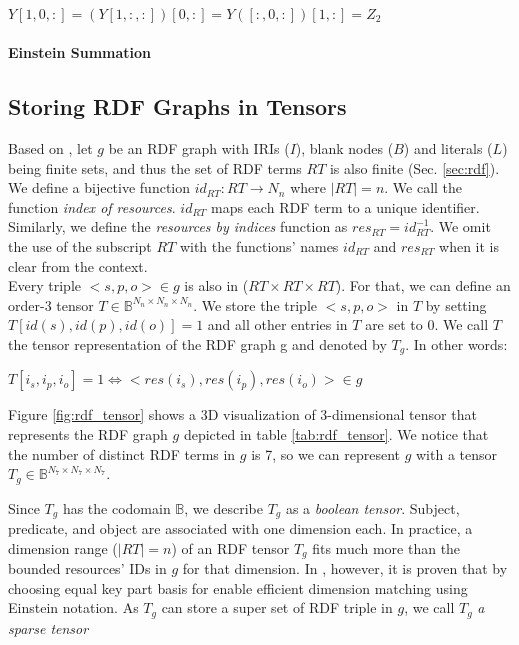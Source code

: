 \centerline{$Y[1, 0, :] = (Y[1, :, :])[0, :] = Y([:, 0, :])[1, :] = Z_2$}

\paragraph{Einstein Summation}
\label{einstein_summation}

\subsection{Storing RDF Graphs in Tensors}
\label{sec:rdf_tensor}
Based on \cite{tentris2020}, let $g$ be an RDF graph with IRIs ($I$), blank nodes ($B$) and literals ($L$) being finite sets, and thus the set of RDF terms $RT$ is also finite (Sec. \ref{sec:rdf}). We define a bijective function $id_{RT}: RT \to N_n$ where $|RT|=n$. We call the function \textit{index of resources}. $id_{RT}$ maps each RDF term to a unique identifier. Similarly, we define the \textit{resources by indices} function as $res_{RT} = id_{RT}^{-1}$. 
We omit the use of the subscript $RT$ with the functions' names $id_{RT}$ and $res_{RT}$ when it is clear from the context. \\

Every triple $<s, p, o> \in g$ is also in ($RT \times RT \times RT$). For that, we can define an order-3 tensor $T \in \mathbb{B}^{N_n \times N_n \times N_n}$. We store the triple $<s, p, o>$ in $T$ by setting $T[id(s), id(p), id(o)] = 1$ and all other entries in $T$ are set to 0. We call $T$ the tensor representation of the RDF graph g and denoted by $T_g$. In other words: \\
\centerline{$T[i_s, i_p, i_o] = 1 \iff <res(i_s), res(i_p), res(i_o)> \in g$}

\begin{example}
Figure \ref{fig:rdf_tensor} shows a 3D visualization of 3-dimensional tensor that represents the RDF graph $g$ depicted in table \ref{tab:rdf_tensor}. We notice that the number of distinct RDF terms in $g$ is 7, so we can represent $g$ with a tensor $T_g \in \mathbb{B}^{N_7 \times N_7 \times N_7}$. 
\end{example}

Since $T_g$ has the codomain $\mathbb{B}$, we describe $T_g$ as a \textit{boolean tensor}. Subject, predicate, and object are associated with one dimension each. In practice, a dimension range  ($|RT| =n$) of an RDF tensor $T_g$ fits much more than the bounded resources' IDs in $g$ for that dimension. In \cite{tentris2020}, however, it is proven that by choosing equal key part basis for enable efficient dimension matching using Einstein notation. As $T_g$ can store a super set of RDF triple in $g$, we call $T_g$ \textit{a sparse tensor}

